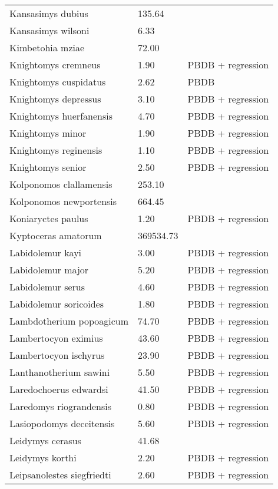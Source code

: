 \begin{longtable}{p{} p{} p{}}
    Kansasimys dubius & 135.64 & \cite{Tomiya2013} \\ 
    Kansasimys wilsoni & 6.33 & \cite{Matthew1901} \\ 
    Kimbetohia mziae & 72.00 & \cite{Wilson2012} \\ 
    Knightomys cremneus & 1.90 & PBDB + regression \\ 
    Knightomys cuspidatus & 2.62 & PBDB \\ 
    Knightomys depressus & 3.10 & PBDB + regression \\ 
    Knightomys huerfanensis & 4.70 & PBDB + regression \\ 
    Knightomys minor & 1.90 & PBDB + regression \\ 
    Knightomys reginensis & 1.10 & PBDB + regression \\ 
    Knightomys senior & 2.50 & PBDB + regression \\ 
    Kolponomos clallamensis & 253.10 & \cite{Tseng2009} \\ 
    Kolponomos newportensis & 664.45 & \cite{Scott2013} \\ 
    Koniaryctes paulus & 1.20 & PBDB + regression \\ 
    Kyptoceras amatorum & 369534.73 & \cite{Tomiya2013} \\ 
    Labidolemur kayi & 3.00 & PBDB + regression \\ 
    Labidolemur major & 5.20 & PBDB + regression \\ 
    Labidolemur serus & 4.60 & PBDB + regression \\ 
    Labidolemur soricoides & 1.80 & PBDB + regression \\ 
    Lambdotherium popoagicum & 74.70 & PBDB + regression \\ 
    Lambertocyon eximius & 43.60 & PBDB + regression \\ 
    Lambertocyon ischyrus & 23.90 & PBDB + regression \\ 
    Lanthanotherium sawini & 5.50 & PBDB + regression \\ 
    Laredochoerus edwardsi & 41.50 & PBDB + regression \\ 
    Laredomys riograndensis & 0.80 & PBDB + regression \\ 
    Lasiopodomys deceitensis & 5.60 & PBDB + regression \\ 
    Leidymys cerasus & 41.68 & \cite{Tomiya2013} \\ 
    Leidymys korthi & 2.20 & PBDB + regression \\ 
    Leipsanolestes siegfriedti & 2.60 & PBDB + regression \\ 

\end{longtable}
